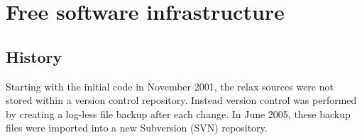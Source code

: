 


\chapter{Free software infrastructure} \label{ch: free software}

\section{History}

Starting with the initial code in November 2001, the relax sources were not stored within a version control repository.
Instead version control was performed by creating a log-less  file backup after each change.
In June 2005, these backup files were imported into a new Subversion (SVN) repository.

